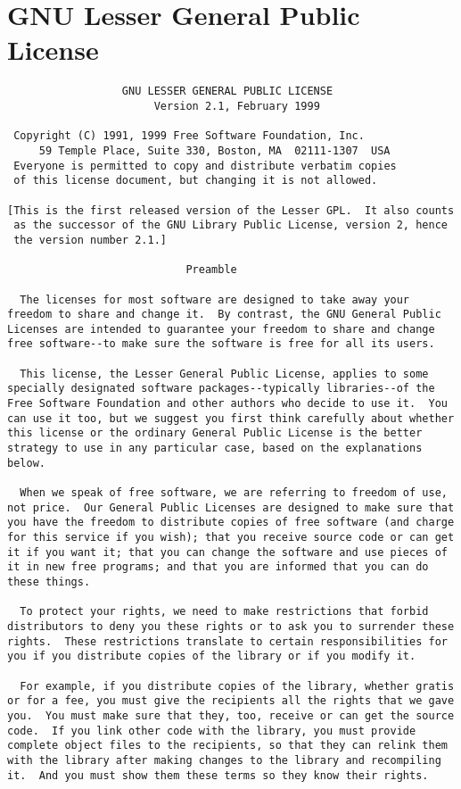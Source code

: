 \documentclass{InsightBook}
\begin{document}
\section{GNU Lesser General Public License}
\begin{verbatim}
                  GNU LESSER GENERAL PUBLIC LICENSE
                       Version 2.1, February 1999

 Copyright (C) 1991, 1999 Free Software Foundation, Inc.
     59 Temple Place, Suite 330, Boston, MA  02111-1307  USA
 Everyone is permitted to copy and distribute verbatim copies
 of this license document, but changing it is not allowed.

[This is the first released version of the Lesser GPL.  It also counts
 as the successor of the GNU Library Public License, version 2, hence
 the version number 2.1.]

                            Preamble

  The licenses for most software are designed to take away your
freedom to share and change it.  By contrast, the GNU General Public
Licenses are intended to guarantee your freedom to share and change
free software--to make sure the software is free for all its users.

  This license, the Lesser General Public License, applies to some
specially designated software packages--typically libraries--of the
Free Software Foundation and other authors who decide to use it.  You
can use it too, but we suggest you first think carefully about whether
this license or the ordinary General Public License is the better
strategy to use in any particular case, based on the explanations below.

  When we speak of free software, we are referring to freedom of use,
not price.  Our General Public Licenses are designed to make sure that
you have the freedom to distribute copies of free software (and charge
for this service if you wish); that you receive source code or can get
it if you want it; that you can change the software and use pieces of
it in new free programs; and that you are informed that you can do
these things.

  To protect your rights, we need to make restrictions that forbid
distributors to deny you these rights or to ask you to surrender these
rights.  These restrictions translate to certain responsibilities for
you if you distribute copies of the library or if you modify it.

  For example, if you distribute copies of the library, whether gratis
or for a fee, you must give the recipients all the rights that we gave
you.  You must make sure that they, too, receive or can get the source
code.  If you link other code with the library, you must provide
complete object files to the recipients, so that they can relink them
with the library after making changes to the library and recompiling
it.  And you must show them these terms so they know their rights.


\end{verbatim}
\end{document}

